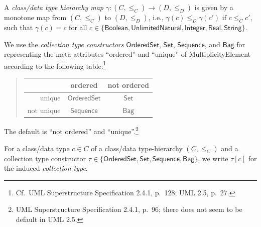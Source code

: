 \documentclass[10pt,fleqn,%
\ifpretendfinal
final%
\else
draft%
\fi,
]{scrreprt}
\newcommand{\uml}[1]{\textsf{#1}}
\begin{document}
A \emph{class/data type hierarchy map}
$\gamma : (C, {\leq_C}) \to (D, {\leq_D})$ is given by a monotone map
from $(C, {\leq_C})$ to $(D, {\leq_D})$, i.e.,
$\gamma(c) \leq_D \gamma(c')$ if $c \leq_C c'$, such that
$\gamma(c) = c$ for all
$c \in \{ \mathsf{Boolean},\allowbreak \mathsf{UnlimitedNatural},\allowbreak
\mathsf{Integer}, \mathsf{Real}, \mathsf{String} \}$.

\medskip
We use the \emph{collection type constructors} $\mathsf{OrderedSet}$,
$\mathsf{Set}$, $\mathsf{Sequence}$, and $\mathsf{Bag}$ for
representing the meta-attributes ``ordered'' and ``unique'' of
\uml{MultiplicityElement} according to the following
table:\footnote{Cf.~UML Superstructure Specification 2.4.1, p.~128; UML
  2.5, p.~27.}
%
\begin{quotation}
\begin{tabular}{@{}r||c|c@{}}
             & ordered               & not ordered\\
\hline\hline
  unique     & $\mathsf{OrderedSet}$ & $\mathsf{Set}$\\
\hline
  not unique & $\mathsf{Sequence}$   & $\mathsf{Bag}$
\end{tabular}
\end{quotation}
%
The default is ``not ordered'' and ``unique''.\footnote{UML
  Superstructure Specification 2.4.1, p.~96; there does not seem to be
  default in UML 2.5.}

For a class/data type $c \in C$ of a class/data type-hierarchy
$(C, {\leq_C})$ and a collection type constructor
$\tau \in \{ \mathsf{OrderedSet}, \mathsf{Set}, \mathsf{Sequence},
\mathsf{Bag} \}$,
we write $\tau[c]$ for the induced \emph{collection type}.
\end{document}
